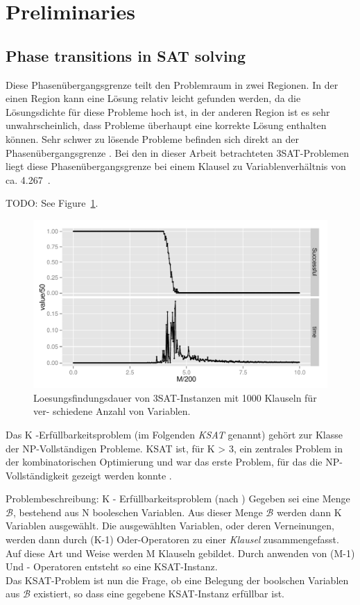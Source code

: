\section{Preliminaries}
\label{sec:preliminaries}


\subsection{Phase transitions in SAT solving}
Diese Phasenübergangsgrenze teilt den Problemraum in zwei Regionen. In der einen Region kann eine Lösung relativ leicht gefunden werden, da die Lösungsdichte für diese Probleme hoch ist, in der anderen Region ist es sehr unwahrscheinlich, dass Probleme überhaupt eine korrekte Lösung enthalten können. Sehr schwer zu lösende Probleme befinden sich direkt an der Phasenübergangsgrenze \cite{cheeseman1991really}. Bei den in dieser Arbeit betrachteten 3SAT-Problemen liegt diese Phasenübergangsgrenze bei einem Klausel zu Variablenverhältnis von ca. 4.267~\cite{mezard2002random}.

TODO: See Figure~\ref{fig:distr}.
\begin{figure}
\centering
\includegraphics[width=.8\textwidth]{../material_2/plot_sat.pdf}
\caption{Loesungsfindungsdauer von 3SAT-Instanzen mit 1000 Klauseln für ver- schiedene Anzahl von Variablen.} \label{fig:distr}
\end{figure}

Das K -Erfüllbarkeitsproblem (im Folgenden\emph{ KSAT} genannt) gehört zur Klasse der NP-Vollständigen Probleme. KSAT ist, für K > 3, ein zentrales Problem in der kombinatorischen Optimierung und war das erste Problem, für das die NP-Vollständigkeit gezeigt werden konnte \cite{mezard2002random}.

Problembeschreibung: K - Erfüllbarkeitsproblem (nach  \cite{mezard2002random})
Gegeben sei eine Menge $\mathcal{B}$, bestehend aus N booleschen Variablen. Aus dieser Menge $\mathcal{B}$ werden dann K Variablen ausgewählt. Die ausgewählten Variablen, oder deren Verneinungen, werden dann durch (K-1) Oder-Operatoren zu einer \emph {Klausel} zusammengefasst. Auf diese Art und Weise werden M Klauseln gebildet. Durch anwenden von (M-1) Und - Operatoren entsteht so eine KSAT-Instanz.\\Das KSAT-Problem ist nun die Frage, ob eine Belegung der boolschen Variablen aus $\mathcal{B}$ existiert, so dass eine gegebene KSAT-Instanz erfüllbar ist.

